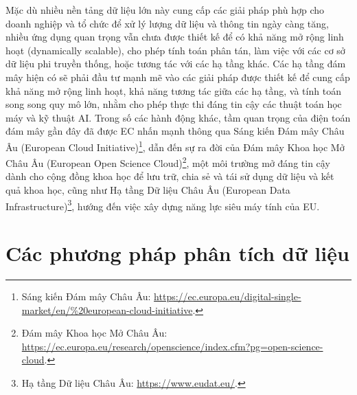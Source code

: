 Mặc dù nhiều nền tảng dữ liệu lớn này cung cấp các giải pháp phù hợp cho doanh nghiệp và tổ chức để xử lý lượng dữ liệu và thông tin ngày càng tăng, nhiều ứng dụng quan trọng vẫn chưa được thiết kế để có khả năng mở rộng linh hoạt (dynamically scalable), cho phép tính toán phân tán, làm việc với các cơ sở dữ liệu phi truyền thống, hoặc tương tác với các hạ tầng khác. Các hạ tầng đám mây hiện có sẽ phải đầu tư mạnh mẽ vào các giải pháp được thiết kế để cung cấp khả năng mở rộng linh hoạt, khả năng tương tác giữa các hạ tầng, và tính toán song song quy mô lớn, nhằm cho phép thực thi đáng tin cậy các thuật toán học máy và kỹ thuật AI. Trong số các hành động khác, tầm quan trọng của điện toán đám mây gần đây đã được EC nhấn mạnh thông qua Sáng kiến Đám mây Châu Âu (European Cloud Initiative)\footnote{Sáng kiến Đám mây Châu Âu: \url{https://ec.europa.eu/digital-single-market/en/\%20european-cloud-initiative}.}, dẫn đến sự ra đời của Đám mây Khoa học Mở Châu Âu (European Open Science Cloud)\footnote{Đám mây Khoa học Mở Châu Âu: \url{https://ec.europa.eu/research/openscience/index.cfm?pg=open-science-cloud}.}, một môi trường mở đáng tin cậy dành cho cộng đồng khoa học để lưu trữ, chia sẻ và tái sử dụng dữ liệu và kết quả khoa học, cũng như Hạ tầng Dữ liệu Châu Âu (European Data Infrastructure)\footnote{Hạ tầng Dữ liệu Châu Âu: \url{https://www.eudat.eu/}.}, hướng đến việc xây dựng năng lực siêu máy tính của EU.

\section{Các phương pháp phân tích dữ liệu}

